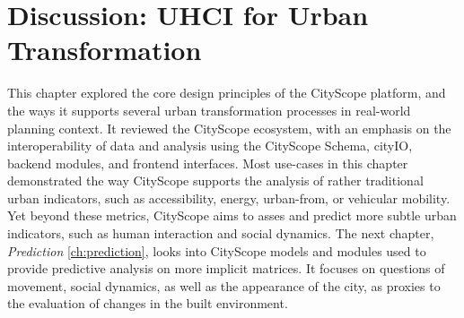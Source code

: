 {    %
    
    
    
    

    \section{Discussion: UHCI for Urban Transformation}
     {
      This chapter explored the core design principles of the CityScope platform, and the ways it supports several urban transformation processes in real-world planning context. It reviewed the CityScope ecosystem, with an emphasis on the interoperability of data and analysis using the CityScope Schema, cityIO, backend modules, and frontend interfaces.
      Most use-cases in this chapter demonstrated the way CityScope supports the analysis of rather traditional urban indicators, such as accessibility, energy, urban-from, or vehicular mobility. Yet beyond these metrics, CityScope aims to asses and predict more subtle urban indicators, such as human interaction and social dynamics. The next chapter, \textit{Prediction} \eqref{ch:prediction}, looks into CityScope models and modules used to provide predictive analysis on more implicit matrices. It focuses on questions of movement, social dynamics, as well as the appearance of the city, as proxies to the evaluation of changes in the built environment.
     }

}
